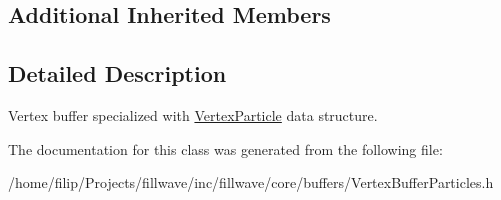 \subsection*{Additional Inherited Members}


\subsection{Detailed Description}
Vertex buffer specialized with \hyperlink{structflw_1_1flc_1_1VertexParticle}{Vertex\+Particle} data structure. 

The documentation for this class was generated from the following file\+:\begin{DoxyCompactItemize}
\item 
/home/filip/\+Projects/fillwave/inc/fillwave/core/buffers/Vertex\+Buffer\+Particles.\+h\end{DoxyCompactItemize}
